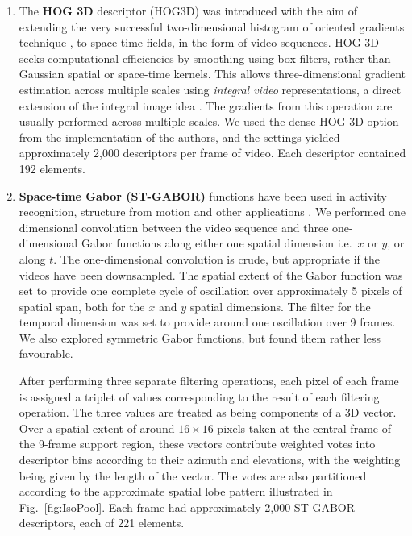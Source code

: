 \begin{enumerate}
\item The \textbf{HOG 3D} descriptor (HOG3D) \citep{Klaser2008} was introduced with the aim of extending the very successful two-dimensional histogram of oriented gradients technique \citep{Dalal}, to space-time fields, in the form of video sequences.  HOG 3D seeks computational efficiencies by smoothing using box filters, rather than Gaussian spatial or space-time kernels.  This allows three-dimensional gradient estimation across multiple scales using {\em integral video} representations, a direct extension of the integral image idea \citep{Viola2001}.  The gradients from this operation are usually performed across multiple scales.  We used the dense HOG 3D option from the implementation of the authors, and the settings yielded approximately 2,000  descriptors per frame of video. Each descriptor contained 192 elements.

\item \textbf{Space-time Gabor (ST-GABOR)} functions have been used in activity recognition, structure from motion and other applications \cite{Bregonzio2009}.  We performed one dimensional convolution between the video sequence and three one-dimensional Gabor functions along either one spatial dimension i.e.\ $x$ or $y$, or along $t$.  The one-dimensional convolution  is crude, but appropriate if the videos have been downsampled. The spatial extent of the Gabor function was set to provide one complete cycle of oscillation over approximately 5 pixels of spatial span, both for the $x$ and $y$ spatial dimensions. The filter for the temporal dimension was set to provide  around one oscillation over 9 frames.  We also explored symmetric Gabor functions, but found them rather less favourable.

After performing three separate filtering operations, each pixel of each frame is assigned a triplet of values corresponding to the result of each filtering operation.  The three values are treated as being components of a 3D vector.  Over a spatial extent of around $16 \times 16$ pixels taken at the central frame of the 9-frame support region, these vectors contribute weighted votes into descriptor bins according to their azimuth and elevations, with the weighting being given by the length of the vector.  The votes are also partitioned according to the approximate spatial lobe pattern illustrated in Fig.~\ref{fig:IsoPool}. Each frame had approximately 2,000 ST-GABOR descriptors, each of 221 elements.



\end{enumerate}
